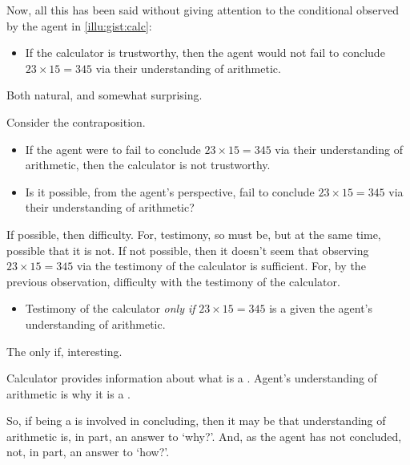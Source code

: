 \begin{note}
  Now, all this has been said without giving attention to the conditional observed by the agent in \autoref{illu:gist:calc}:

  \begin{itemize}
  \item
    If the calculator is trustworthy, then the agent would not fail to conclude \(23 \times 15 = 345\) via their understanding of arithmetic.
  \end{itemize}

  Both natural, and somewhat surprising.

  Consider the contraposition.

  \begin{itemize}
  \item
    If the agent were to fail to conclude \(23 \times 15 = 345\) via their understanding of arithmetic, then the calculator is not trustworthy.
  \end{itemize}

  \begin{itemize}
  \item
    Is it possible, from the agent's perspective, fail to conclude \(23 \times 15 = 345\) via their understanding of arithmetic?
  \end{itemize}

  If possible, then difficulty.
  For, testimony, so must be, but at the same time, possible that it is not.
  If not possible, then it doesn't seem that observing \(23 \times 15 = 345\) via the testimony of the calculator is sufficient.
  For, by the previous observation, difficulty with the testimony of the calculator.

  \begin{itemize}
  \item
    Testimony of the calculator \emph{only if} \(23 \times 15 = 345\) is a  given the agent's understanding of arithmetic.
  \end{itemize}
\end{note}

\begin{note}
  The only if, interesting.

  Calculator provides information about what is a \fc{}.
  Agent's understanding of arithmetic is why it is a \fc{}.

  So, if being a  is involved in concluding, then it may be that understanding of arithmetic is, in part, an answer to `why?'.
  And, as the agent has not concluded, not, in part, an answer to `how?'.
\end{note}

